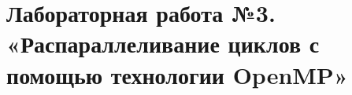 { %
	\section{Лабораторная работа №3. «Распараллеливание циклов с помощью технологии OpenMP»}
	
	
	
}
